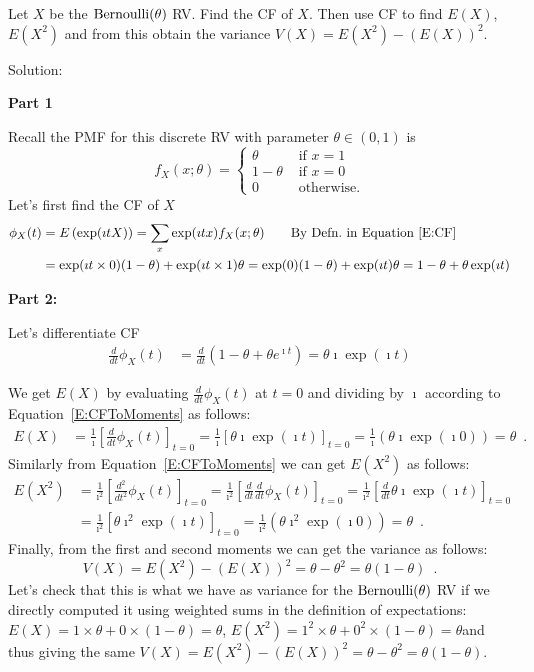 \begin{example}
Let $X$ be the $\mbox{{\rm Bernoulli}}(\theta)$ RV.  
Find the CF of $X$.   
Then use CF to find $E(X)$, $E(X^2)$ and from this obtain the variance $V(X) = E(X^2)-(E(X))^2$.

Solution: 

{\bf Part 1}

Recall the PMF for this discrete RV with parameter $\theta \in (0,1)$ is
\[
f_X(x;\theta) = 
\begin{cases}
\theta & \text{ if } x = 1\\
1-\theta & \text{ if } x = 0\\
0 & \text{ otherwise}.
\end{cases}
\]
Let's first find the CF of $X$
\begin{align*}
\phi_X(t)
&= E \left( \exp(\imath t X) \right) 
= \sum_x  \exp(\imath t x) f_X(x;\theta) \qquad \text{By Defn.~in Equation~\eqref{E:CF}}\\
&= \exp(\imath t \times 0) (1-\theta) + \exp(\imath t \times 1) \theta 
= \exp(0) (1-\theta) + \exp(\imath t) \theta 
=  1-\theta + \theta \exp(\imath t)  
\end{align*}

{\bf Part 2:}

Let's differentiate CF 
\begin{align*}
\frac{d}{dt}\phi_X(t)
&= \frac{d}{dt}\left(1-\theta + \theta e^{\imath t} \right) 
=  \theta \imath \exp(\imath t)
\end{align*}

We get $E(X)$ by evaluating $\frac{d}{dt}\phi_X(t)$ at $t=0$ and dividing by $\imath$ according to Equation~\eqref{E:CFToMoments} as follows:
\begin{align*}
E(X)
&= \frac{1}{\imath} \left[ \frac{d}{dt}\phi_X(t) \right]_{t=0} 
= \frac{1}{\imath} \left[ \theta \imath \exp(\imath t) \right]_{t=0} 
= \frac{1}{\imath} \left( \theta \imath \exp(\imath 0) \right) 
=  \theta \enspace.
\end{align*}
Similarly from Equation~\eqref{E:CFToMoments} we can get $E(X^2)$ as follows:
\begin{align*}
E(X^2)
&= \frac{1}{\imath^2} \left[ \frac{d^2}{dt^2}\phi_X(t) \right]_{t=0} 
= \frac{1}{\imath^2} \left[ \frac{d}{dt} \frac{d}{dt} \phi_X(t) \right]_{t=0} 
= \frac{1}{\imath^2} \left[ \frac{d}{dt} \theta \imath \exp(\imath t) \right]_{t=0}\\ 
&= \frac{1}{\imath^2} \left[ \theta \imath^2 \exp(\imath t) \right]_{t=0} 
= \frac{1}{\imath^2} \left( \theta \imath^2 \exp(\imath 0) \right) 
=  \theta \enspace.
\end{align*}
Finally, from the first and second moments we can get the variance as follows:
\[
V(X) = E(X^2) - (E(X))^2 = \theta - \theta^2 = \theta(1-\theta) \enspace .
\]
Let's check that this is what we have as variance for the $\mbox{{\rm Bernoulli}}(\theta)$ RV if we directly computed it using weighted sums in the definition of expectations: $E(X)=1 \times \theta + 0 \times (1-\theta)=\theta$, $E(X^2) = 1^2 \times \theta + 0^2 \times (1-\theta)=\theta$and thus giving the same $V(X) = E(X^2) - (E(X))^2 = \theta - \theta^2 = \theta(1-\theta)$.
\end{example}

